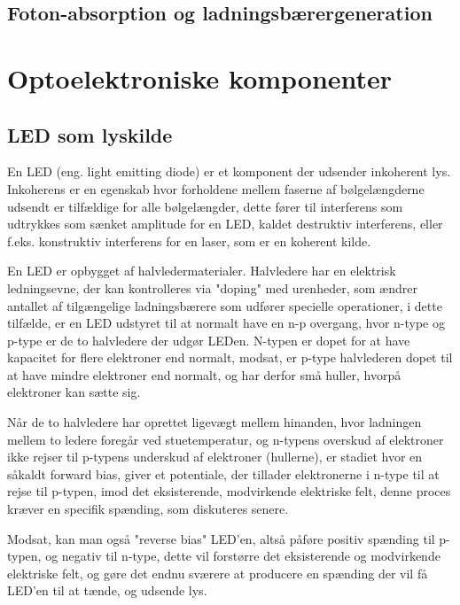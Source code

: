 \subsection{Foton-absorption og ladningsbærergeneration}



\section{Optoelektroniske komponenter}
    \subsection{LED som lyskilde}   

En LED (eng. light emitting diode) er et komponent der udsender inkoherent lys. Inkoherens er en egenskab hvor forholdene mellem faserne af bølgelængderne udsendt er tilfældige for alle bølgelængder, dette fører til interferens som udtrykkes som sænket amplitude for en LED, kaldet destruktiv interferens, eller f.eks. konstruktiv interferens for en laser, som er en koherent kilde.

En LED er opbygget af halvledermaterialer. Halvledere har en elektrisk ledningsevne, der kan kontrolleres via "doping" med urenheder, som ændrer antallet af tilgængelige ladningsbærere som udfører specielle operationer, i dette tilfælde, er en LED udstyret til at normalt have en n-p overgang, hvor n-type og p-type er de to halvledere der udgør LEDen. N-typen er dopet for at have kapacitet for flere elektroner end normalt, modsat, er p-type halvlederen dopet til at have mindre elektroner end normalt, og har derfor små huller, hvorpå elektroner kan sætte sig.

Når de to halvledere har oprettet ligevægt mellem hinanden, hvor ladningen mellem to ledere foregår ved stuetemperatur, og n-typens overskud af elektroner ikke rejser til p-typens underskud af elektroner (hullerne), er stadiet hvor en såkaldt forward bias, giver et potentiale, der tillader elektronerne i n-type til at rejse til p-typen, imod det eksisterende, modvirkende elektriske felt, denne proces kræver en specifik spænding, som diskuteres senere.

Modsat, kan man også "reverse bias" LED'en, altså påføre positiv spænding til p-typen, og negativ til n-type, dette vil forstørre det eksisterende og modvirkende elektriske felt, og gøre det endnu sværere at producere en spænding der vil få LED'en til at tænde, og udsende lys.

